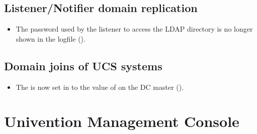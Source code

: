 

\subsection{Listener/Notifier domain replication}
\begin{itemize}
\item The password used by the listener to access the LDAP directory is no longer shown in the logfile ().
\end{itemize}

\subsection{Domain joins of UCS systems}
\begin{itemize}

\item The  is now set in  to
the value of  on the DC master ().

\end{itemize}


\section{Univention Management Console}

